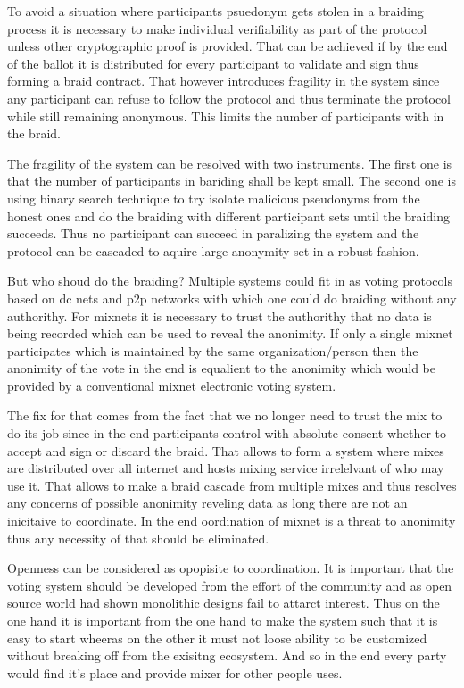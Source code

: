 \documentclass{article}
\begin{document}
To avoid a situation where participants psuedonym gets stolen in a braiding process it is necessary to make individual verifiability as part of the protocol unless other cryptographic proof is provided. That can be achieved if by the end of the ballot it is distributed for every participant to validate and sign thus forming a braid contract. That however introduces fragility in the system since any participant can refuse to follow the protocol and thus terminate the protocol while still remaining anonymous. This limits the number of participants with in the braid.

The fragility of the system can be resolved with two instruments. The first one is that the number of participants in bariding shall be kept small. The second one is using binary search technique to try isolate malicious pseudonyms from the honest ones and do the braiding with different participant sets until the braiding succeeds. Thus no participant can succeed in paralizing the system and the protocol can be cascaded to aquire large anonymity set in a robust fashion.

But who shoud do the braiding? Multiple systems could fit in as voting protocols based on dc nets and p2p networks with which one could do braiding without any authorithy. For mixnets it is necessary to trust the authorithy that no data is being recorded which can be used to reveal the anonimity. If only a single mixnet participates which is maintained by the same organization/person then the anonimity of the vote in the end is equalient to the anonimity which would be provided by a conventional mixnet electronic voting system. 

The fix for that comes from the fact that we no longer need to trust the mix to do its job since in the end participants control with absolute consent whether to accept and sign or discard the braid. That allows to form a system where mixes are distributed over all internet and hosts mixing service irrelelvant of who may use it. That allows to make a braid cascade from multiple mixes and thus resolves any concerns of possible anonimity reveling data as long there are not an inicitaive to coordinate. In the end oordination of mixnet is a threat to anonimity thus any necessity of that should be eliminated.

Openness can be considered as opopisite to coordination. It is important that the voting system should be developed from the effort of the community and as open source world had shown monolithic designs fail to attarct interest. Thus on the one hand it is important from the one hand to make the system such that it is easy to start wheeras on the other it must not loose ability to be customized without breaking off from the exisitng ecosystem. And so in the end every party would find it's place and provide mixer for other people uses.
\end{document}
